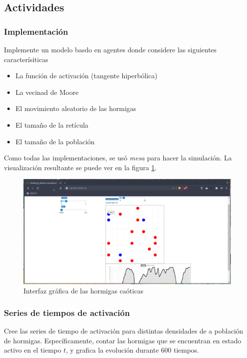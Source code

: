 \documentclass{article}
\begin{document}
\subsection{Actividades}

\subsubsection{Implementación}

Implemente un modelo basdo en agentes donde considere las siguientes
caracterísiticas

\begin{itemize}
  \item La función de activación (tangente hiperbólica)
  \item La vecinad de Moore
  \item El movimiento aleatorio de las hormigas
  \item El tamaño de la retícula
  \item El tamaño de la población
\end{itemize}

Como todas las implementaciones, se usó \textit{mesa} para hacer la simulación.
La visualización resultante se puede ver en la figura \ref{fig:ant-ui}.

\begin{figure}
  \centering
  \includegraphics[width=\textwidth]{imgs/ants-ui.png}
  \caption{Interfaz gráfica de las hormigas caóticas}
  \label{fig:ant-ui}
\end{figure}

\subsubsection{Series de tiempos de activación}

Cree las series de tiempo de activación para distintas densidades de a población
de hormigas. Específicamente, contar las hormigas que se encuentran en estado
activo en el tiempo $t$, y grafica la evolución durante 600 tiempos.
\end{document}

